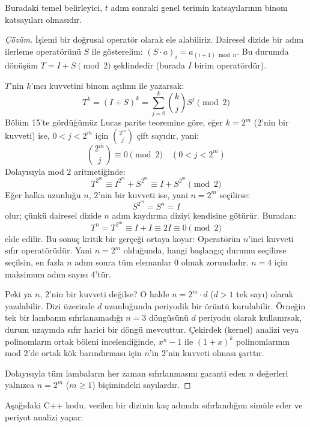 Buradaki temel belirleyici, $t$ adım sonraki genel terimin katsayılarının binom katsayıları olmasıdır.

\begin{proof}[Çözüm]
İşlemi bir doğrusal operatör olarak ele alabiliriz. Dairesel dizide bir adım ilerleme operatörünü $S$ ile gösterelim: $(S \cdot a)_i = a_{(i+1) \bmod n}$. Bu durumda dönüşüm $T = I + S \pmod 2$ şeklindedir (burada $I$ birim operatördür).

$T$'nin $k$'ıncı kuvvetini binom açılımı ile yazarsak:
\[
T^k = (I + S)^k = \sum_{j=0}^k \binom{k}{j} S^j \pmod 2
\]
Bölüm 15'te gördüğümüz Lucas parite teoremine göre, eğer $k = 2^m$ ($2$'nin bir kuvveti) ise, $0 < j < 2^m$ için $\binom{2^m}{j}$ çift sayıdır, yani:
\[
\binom{2^m}{j} \equiv 0 \pmod 2 \quad (0 < j < 2^m)
\]
Dolayısıyla mod $2$ aritmetiğinde:
\[
T^{2^m} \equiv I^{2^m} + S^{2^m} \equiv I + S^{2^m} \pmod 2
\]
Eğer halka uzunluğu $n$, $2$'nin bir kuvveti ise, yani $n = 2^m$ seçilirse:
\[
S^{2^m} = S^n = I
\]
olur; çünkü dairesel dizide $n$ adım kaydırma diziyi kendisine götürür. Buradan:
\[
T^n = T^{2^m} \equiv I + I \equiv 2I \equiv 0 \pmod 2
\]
elde edilir. Bu sonuç kritik bir gerçeği ortaya koyar: Operatörün $n$'inci kuvveti sıfır operatörüdür. Yani $n = 2^m$ olduğunda, hangi başlangıç durumu seçilirse seçilsin, en fazla $n$ adım sonra tüm elemanlar $0$ olmak zorundadır. $n=4$ için maksimum adım sayısı 4'tür.

Peki ya $n$, $2$'nin bir kuvveti değilse? O halde $n = 2^m \cdot d$ ($d > 1$ tek sayı) olarak yazılabilir. Dizi üzerinde $d$ uzunluğunda periyodik bir örüntü kurulabilir. Örneğin tek bir lambanın sıfırlanamadığı $n=3$ döngüsünü $d$ periyodu olarak kullanırsak, durum uzayında sıfır harici bir döngü mevcuttur. Çekirdek (kernel) analizi veya polinomların ortak böleni incelendiğinde, $x^n - 1$ ile $(1+x)^k$ polinomlarının mod $2$'de ortak kök barındırması için $n$'in $2$'nin kuvveti olması şarttır.

Dolayısıyla tüm lambaların her zaman sıfırlanmasını garanti eden $n$ değerleri yalnızca $n = 2^m$ ($m \ge 1$) biçimindeki sayılardır.
\end{proof}

Aşağıdaki C++ kodu, verilen bir dizinin kaç adımda sıfırlandığını simüle eder ve periyot analizi yapar:

